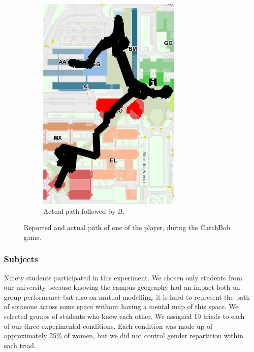 \documentclass[twocolumn]{article}
\begin{document}
\begin{figure}[h!t]
\begin{subfigure}{.3\textwidth}
            \includegraphics[width=\linewidth]{image7.png}
            \caption{Actual path followed by B.}
        \end{subfigure}
        \caption{Reported and actual path of one of the player, during the {\sc
        CatchBob} game.}
        \label{study2:paths}
\end{figure}

\subsubsection*{Subjects}

Ninety students participated in this experiment. We chosen only students from
our university because knowing the campus geography had an impact both on group
performance but also on mutual modelling: it is hard to represent the path of
someone across some space without having a mental map of this space. We selected
groups of students who knew each other. We assigned 10 triads to each of our
three experimental conditions. Each condition was made up of approximately 25\%
of women, but we did not control gender repartition within each triad.
\end{document}

